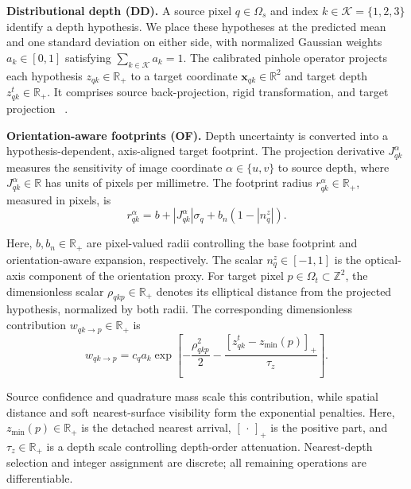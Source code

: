 \documentclass[letterpaper,10pt,conference]{ieeeconf}
\newcommand{\R}{\mathbb{R}}
\begin{document}
\textbf{Distributional depth (DD).}
A source pixel
$q\in\Omega_s$ and index $k\in\mathcal K=\{1,2,3\}$ identify a depth
hypothesis. We place these hypotheses
at the predicted mean and one standard deviation on either side, with
normalized Gaussian weights $a_k\in[0,1]$ satisfying
$\sum_{k\in\mathcal K}a_k=1$. The calibrated pinhole operator projects each
hypothesis $z_{qk}\in\R_+$ to a target coordinate
$\mathbf x_{qk}\in\R^2$ and target depth $z^t_{qk}\in\R_+$. It comprises source
back-projection, rigid transformation, and target projection
~\cite{wiles2020synsin,niklaus2020softmax}.

\textbf{Orientation-aware footprints (OF).}
Depth uncertainty is converted into a hypothesis-dependent, axis-aligned
target footprint. The projection derivative $J^\alpha_{qk}$ measures the
sensitivity of image coordinate $\alpha\in\{u,v\}$ to source depth, where
$J^\alpha_{qk}\in\R$ has units of pixels per millimetre. The footprint radius
$r^\alpha_{qk}\in\R_+$, measured in pixels, is
\begin{equation}
 r^\alpha_{qk}
 =b+|J^\alpha_{qk}|\sigma_q+b_n(1-|n_q^z|).
\label{eq:dss-footprint}
\end{equation}

Here, $b,b_n\in\R_+$ are pixel-valued radii controlling the base footprint and
orientation-aware expansion, respectively. The scalar
$n_q^z\in[-1,1]$ is the optical-axis component of the orientation proxy. For
target pixel $p\in\Omega_t\subset\mathbb Z^2$, the dimensionless scalar
$\rho_{qkp}\in\R_+$ denotes its elliptical distance from the projected
hypothesis, normalized by both radii. The corresponding dimensionless
contribution $w_{qk\rightarrow p}\in\R_+$ is
\begin{equation}
 w_{qk\rightarrow p}=c_q a_k\exp\!\left[
 -\frac{\rho_{qkp}^2}{2}
 -\frac{[z^t_{qk}-z_{\min}(p)]_+}{\tau_z}\right].
\label{eq:dss-weight}
\end{equation}

Source confidence and quadrature mass scale this contribution, while spatial
distance and soft nearest-surface visibility form the exponential penalties.
Here, $z_{\min}(p)\in\R_+$ is the detached nearest arrival, $[\,\cdot\,]_+$ is
the positive part, and $\tau_z\in\R_+$ is a depth scale controlling
depth-order attenuation. Nearest-depth
selection and integer assignment are discrete; all remaining operations are
differentiable.
\end{document}
